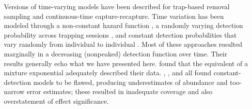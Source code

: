 \documentclass[12pt]{article}
\begin{document}

Versions of time-varying models have been described for trap-based removal sampling and continuous-time capture-recapture.  
Time variation has been modeled through a non-constant hazard function \citep{Schnute1983, HwangChao2002}, a randomly varying detection probability across trapping sessions \citep{WangLoneragan1996}, and constant detection probabilities that vary randomly from individual to individual \citep{Mantyniemi2005, Laplanche2010}.
Most of these approaches resulted marginally in a decreasing (nonpeaked) detection function over time.  
Their results generally echo what we have presented here.  
\citet{Schnute1983} found that the equivalent of a mixture exponential adequately described their data.
\citet{WangLoneragan1996}, \citet{HwangChao2002}, and \citet{Mantyniemi2005} all found constant-detection models to be flawed, producing underestimates of abundance and too-narrow error estimates; these resulted in inadequate coverage and also overstatement of effect significance.  
\end{document}
